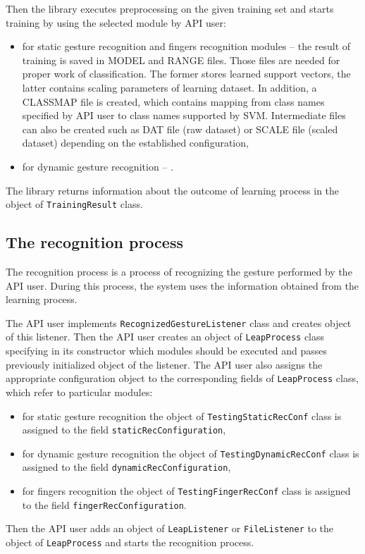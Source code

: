 Then the library executes preprocessing on the given training set and starts training by using the selected module by API user:
\begin{itemize}
\item for static gesture recognition and fingers recognition modules -- the result of training is saved in MODEL and RANGE files. Those files are needed for proper work of classification. The former stores learned support vectors, the latter contains scaling parameters of learning dataset. In addition, a CLASSMAP file is created, which contains mapping from class names specified by API user to class names supported by SVM. Intermediate files can also be created such as DAT file (raw dataset) or SCALE file (scaled dataset) depending on the established configuration,
\item {\color{red}for dynamic gesture recognition -- .}
\end{itemize}

The library returns information about the outcome of learning process in the object of \linebreak \texttt{TrainingResult} class.


\subsection{The recognition process}
The recognition process is a process of recognizing the gesture performed by the API user. During this process, the system uses the information obtained from the learning process. 

The API user implements \texttt{RecognizedGestureListener} class and creates object of this listener. Then the API user creates an object of \texttt{LeapProcess} class specifying in its constructor which modules should be executed and passes previously initialized object of the listener. The API user also assigns the appropriate configuration object to the corresponding fields of \texttt{LeapProcess} class, which refer to particular modules:
\begin{itemize}
\item for static gesture recognition the object of \texttt{TestingStaticRecConf} class is assigned to the field \texttt{staticRecConfiguration},
\item for dynamic gesture recognition the object of \texttt{TestingDynamicRecConf} class is assigned to the field \texttt{dynamicRecConfiguration},
\item for fingers recognition the object of \texttt{TestingFingerRecConf} class is assigned to the field \texttt{fingerRecConfiguration}.
\end{itemize}
Then the API user adds an object of \texttt{LeapListener} or \texttt{FileListener} to the object of \texttt{LeapProcess} and starts the recognition process.


